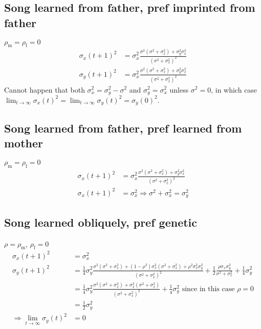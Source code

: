 \documentclass{article}
\newcommand{\x}[1]{\text{#1}}
\begin{document}
\subsection{Song learned from father, pref imprinted from father } 
$\rho_\x{m}=\rho_\x{f}=0$
\begin{align*}
\sigma_x(t+1)^2&=\sigma_x^2\frac{\sigma^2(\sigma^2+\sigma_x^2)+\sigma_y^2\sigma_x^2}{(\sigma^2+\sigma_x^2)^2} 
\\ \sigma_y(t+1)^2&=\sigma_x^2\frac{\sigma^2(\sigma^2+\sigma_x^2)+\sigma_y^2\sigma_x^2}{(\sigma^2+\sigma_x^2)^2}
\end{align*}
Cannot happen that both $\sigma_x^2=\sigma_y^2-\sigma^2$ and $\sigma_y^2=\sigma_x^2$ unless $\sigma^2=0$, in which case $\lim_{t\to\infty}\sigma_x(t)^2=\lim_{t\to\infty}\sigma_y(t)^2=\sigma_y(0)^2$.
\subsection{Song learned from father, pref learned from mother }
$\rho_\x{m}=\rho_\x{f}=0$
\begin{align*}
\sigma_x(t+1)^2&=\sigma_x^2\frac{\sigma^2(\sigma^2+\sigma_x^2)+\sigma_y^2\sigma_x^2}{(\sigma^2+\sigma_x^2)^2}
\\ \sigma_x(t+1)^2&=\sigma_x^2 \Rightarrow \sigma^2+\sigma_x^2=\sigma_y^2
\end{align*}
\subsection{Song learned obliquely, pref genetic }
$\rho=\rho_\x{m}$, $\rho_\x{f}=0$
\begin{align*}
\sigma_x(t+1)^2&=\sigma_x^2
\\ \sigma_y(t+1)^2&=\frac{1}{4}\sigma_y^2\frac{\sigma^2(\sigma^2+\sigma_x^2)+(1-\rho^2)\sigma_x^2(\sigma^2+\sigma_x^2)+\rho^2\sigma_x^2\sigma_y^2}{(\sigma^2+\sigma_x^2)^2}+\frac{1}{2}\frac{\rho\sigma_x\sigma_y^3}{\sigma^2+\sigma_x^2}+\frac{1}{4}\sigma_y^2 
\\&=\frac{1}{4}\sigma_y^2\frac{\sigma^2(\sigma^2+\sigma_x^2)+\sigma_x^2(\sigma^2+\sigma_x^2)}{(\sigma^2+\sigma_x^2)^2}+\frac{1}{4}\sigma_y^2  \text{ since in this case $\rho=0$}
\\&=\frac{1}{2}\sigma_y^2
\\ \Rightarrow \lim_{t\to\infty}\sigma_y(t)^2&=0
\end{align*}
\end{document}
